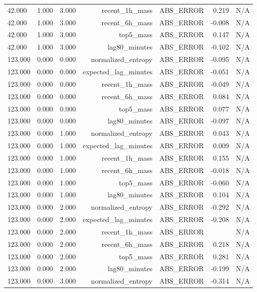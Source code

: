 \begin{table}[h!]
\begin{tabular}{lrrrrrr}
42.000 & 1.000 & 3.000 & recent\_1h\_mass & ABS\_ERROR & 0.219 & N/A \\
42.000 & 1.000 & 3.000 & recent\_6h\_mass & ABS\_ERROR & -0.008 & N/A \\
42.000 & 1.000 & 3.000 & top5\_mass & ABS\_ERROR & 0.147 & N/A \\
42.000 & 1.000 & 3.000 & lag80\_minutes & ABS\_ERROR & -0.102 & N/A \\
123.000 & 0.000 & 0.000 & normalized\_entropy & ABS\_ERROR & -0.095 & N/A \\
123.000 & 0.000 & 0.000 & expected\_lag\_minutes & ABS\_ERROR & -0.051 & N/A \\
123.000 & 0.000 & 0.000 & recent\_1h\_mass & ABS\_ERROR & -0.049 & N/A \\
123.000 & 0.000 & 0.000 & recent\_6h\_mass & ABS\_ERROR & 0.084 & N/A \\
123.000 & 0.000 & 0.000 & top5\_mass & ABS\_ERROR & 0.077 & N/A \\
123.000 & 0.000 & 0.000 & lag80\_minutes & ABS\_ERROR & -0.097 & N/A \\
123.000 & 0.000 & 1.000 & normalized\_entropy & ABS\_ERROR & 0.043 & N/A \\
123.000 & 0.000 & 1.000 & expected\_lag\_minutes & ABS\_ERROR & 0.009 & N/A \\
123.000 & 0.000 & 1.000 & recent\_1h\_mass & ABS\_ERROR & 0.155 & N/A \\
123.000 & 0.000 & 1.000 & recent\_6h\_mass & ABS\_ERROR & -0.018 & N/A \\
123.000 & 0.000 & 1.000 & top5\_mass & ABS\_ERROR & -0.060 & N/A \\
123.000 & 0.000 & 1.000 & lag80\_minutes & ABS\_ERROR & 0.104 & N/A \\
123.000 & 0.000 & 2.000 & normalized\_entropy & ABS\_ERROR & -0.292 & N/A \\
123.000 & 0.000 & 2.000 & expected\_lag\_minutes & ABS\_ERROR & -0.208 & N/A \\
123.000 & 0.000 & 2.000 & recent\_1h\_mass & ABS\_ERROR &  & N/A \\
123.000 & 0.000 & 2.000 & recent\_6h\_mass & ABS\_ERROR & 0.218 & N/A \\
123.000 & 0.000 & 2.000 & top5\_mass & ABS\_ERROR & 0.281 & N/A \\
123.000 & 0.000 & 2.000 & lag80\_minutes & ABS\_ERROR & -0.199 & N/A \\
123.000 & 0.000 & 3.000 & normalized\_entropy & ABS\_ERROR & -0.314 & N/A \\

\end{tabular}
\end{table}
